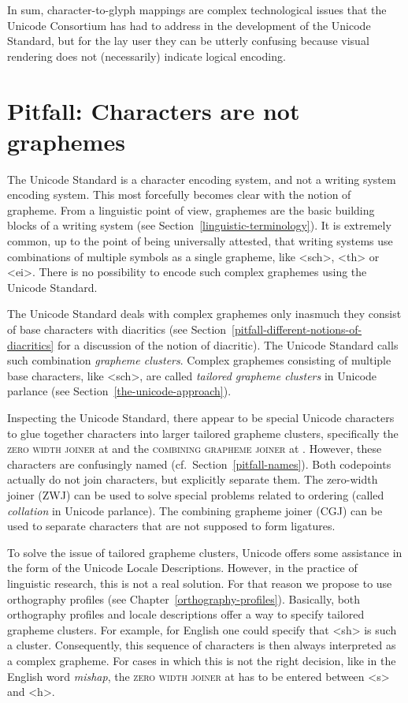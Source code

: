 In sum, character-to-glyph mappings are complex technological issues that the
Unicode Consortium has had to address in the development of the Unicode
Standard, but for the lay user they can be utterly confusing because visual
rendering does not (necessarily) indicate logical encoding.

\section{Pitfall: Characters are not graphemes}
\label{pitfall-characters-are-not-graphemes}

The Unicode Standard is a character encoding system, and not a writing system
encoding system. This most forcefully becomes clear with the notion of grapheme.
From a linguistic point of view, graphemes are the basic building blocks of a
writing system (see Section~\ref{linguistic-terminology}). It is extremely
common, up to the point of being universally attested, that writing systems use
combinations of multiple symbols as a single grapheme, like <sch>, <th> or <ei>.
There is no possibility to encode such complex graphemes using the Unicode Standard.

The Unicode Standard deals with complex graphemes only inasmuch they consist of
base characters with diacritics (see
Section~\ref{pitfall-different-notions-of-diacritics} for a discussion of the
notion of diacritic). The Unicode Standard calls such combination \textit{grapheme
clusters}. Complex graphemes consisting of multiple base characters,
like <sch>, are called \textit{tailored grapheme clusters} in Unicode parlance (see
Section~\ref{the-unicode-approach}).

Inspecting the Unicode Standard, there appear to be special Unicode characters
to glue together characters into larger tailored grapheme clusters,
specifically the \textsc{zero width joiner} at  and the
\textsc{combining grapheme joiner} at . However, these characters are
confusingly named (cf.~Section~\ref{pitfall-names}). Both codepoints actually do
not join characters, but explicitly separate them. The zero-width joiner (ZWJ)
can be used to solve special problems related to ordering (called \textit{collation}
in Unicode parlance). The combining grapheme joiner (CGJ) can be used to
separate characters that are not supposed to form ligatures. 

To solve the issue of tailored grapheme clusters, Unicode offers some assistance
in the form of the Unicode Locale Descriptions. However, in the practice of
linguistic research, this is not a real solution. For that reason we propose to
use orthography profiles (see Chapter~\ref{orthography-profiles}). Basically,
both orthography profiles and locale descriptions offer a way to specify
tailored grapheme clusters. For example, for English one could specify that <sh>
is such a cluster. Consequently, this sequence of characters is then always
interpreted as a complex grapheme. For cases in which this is not the right
decision, like in the English word \textit{mishap}, the \textsc{zero width
joiner} at  has to be entered between <s> and <h>.

